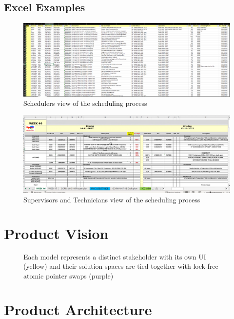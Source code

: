 \documentclass{article}
\begin{document}
\subsection{Excel Examples}
\begin{figure}[H]
\includegraphics[width=1.0\textwidth]{../../../project-plans/scipo-total/figures/schedulers-view-into-the-scheduling-process.png}
\caption{Schedulers view of the scheduling process}
\end{figure}
\begin{figure}[H]
\includegraphics[width=1.0\textwidth]{../../../project-plans/scipo-total/figures/technician-excel.png}
\caption{Supervisors and Technicians view of the scheduling process}
\end{figure}
\section{Product Vision}


\begin{figure}[H]
    \centering
    \drawModelSetupHexagon[simplified=true]
    \caption{Each model represents a distinct stakeholder with its own UI (yellow) and their solution spaces are tied together with
        lock-free atomic pointer swaps (purple)}
\end{figure}

\section{Product Architecture}
\end{document}
